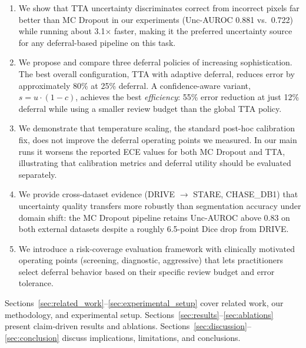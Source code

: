 \begin{enumerate}[leftmargin=*]
  \item We show that TTA uncertainty discriminates correct from incorrect pixels
  far better than MC Dropout in our experiments
  (Unc-AUROC 0.881 vs.\ 0.722) while running about 3.1$\times$ faster,
  making it the preferred uncertainty source for any
  deferral-based pipeline on this task.

  \item We propose and compare three deferral policies of increasing
  sophistication. The best overall configuration, TTA with adaptive deferral,
  reduces error by approximately 80\% at 25\% deferral. A confidence-aware
  variant, $s = u \cdot (1 - c)$, achieves the best \emph{efficiency}: 55\%
  error reduction at just 12\% deferral while using a smaller review budget
  than the global TTA policy.

  \item We demonstrate that temperature scaling, the standard post-hoc
  calibration fix, does not improve the deferral operating points we measured. In our main runs it worsens the reported ECE
  values for both MC Dropout and TTA, illustrating that calibration metrics
  and deferral utility should be evaluated separately.

  \item We provide cross-dataset evidence (DRIVE $\to$ STARE, CHASE\_DB1)
  that uncertainty quality transfers more robustly than segmentation accuracy
  under domain shift: the MC Dropout pipeline retains Unc-AUROC above 0.83 on
  both external datasets despite a roughly 6.5-point Dice drop from DRIVE.

  \item We introduce a risk-coverage evaluation framework with clinically
  motivated operating points (screening, diagnostic, aggressive) that lets
  practitioners select deferral behavior based on their specific review
  budget and error tolerance.
\end{enumerate}

Sections~\ref{sec:related_work}--\ref{sec:experimental_setup} cover related
work, our methodology, and experimental setup.
Sections~\ref{sec:results}--\ref{sec:ablations} present claim-driven results
and ablations. Sections~\ref{sec:discussion}--\ref{sec:conclusion} discuss
implications, limitations, and conclusions.
